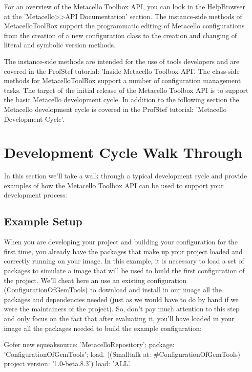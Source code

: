 \documentclass[a4paper,10pt,twoside]{book}
\begin{document}

For an overview of the Metacello Toolbox API, you can look in the HelpBrowser at the 'Metacello>>API Documentation' section. The instance-side methods of MetacelloToolBox support the  programmatic editing of Metacello configurations from the creation of a new configuration class to the creation and changing of literal and symbolic version methods.

The instance-side methods are intended for the use of tools developers and are covered in the ProfStef tutorial: 'Inside Metacello Toolbox API'. The class-side methods for MetacelloToolBox support a number of configuration management tasks. The target of the initial release of the Metacello Toolbox API is to support the basic Metacello development cycle. In addition to the following section the Metacello development cycle is covered in the ProfStef tutorial: 'Metacello Development Cycle'.


\section{Development Cycle Walk Through}

In this section we'll take a walk through a typical development cycle and provide examples of how the Metacello Toolbox API can be used to support your development process:

\subsection{Example Setup}

When you are developing your project and building your configuration for the first time, you already have the packages that make up your project loaded and correctly running on your image. In this example, it is necessary to load a set of packages to simulate a image that will be used to build the first configuration of the project. We'll cheat here an use an existing configuration (ConfigurationOfGemTools) to download and install in our image all the packages and dependencies needed (just as we would have to do by hand if we were the maintainers of the project). So, don't pay much attention to this step and only focus on the fact that after evaluating it, you'll have loaded in your image all the packages needed to build the example configuration:

\begin{code}{}
Gofer new
  squeaksource: 'MetacelloRepository';
  package: 'ConfigurationOfGemTools';
  load.
((Smalltalk at: #ConfigurationOfGemTools) project version: '1.0-beta.8.3')
  load: 'ALL'.
\end{code}
\end{document}
